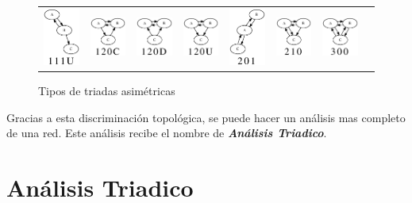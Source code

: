 \begin{figure}[!htb]
\begin{center}
\begin{tabular}{m{1.3cm}|m{1.3cm}|m{1.3cm}|m{1.3cm}|m{1.3cm}|m{1.3cm}|m{1.3cm}|m{1.3cm}}
        \includegraphics[width=1.3cm]{./imagenes/triada_111U.eps} & 
        \includegraphics[width=1.3cm]{./imagenes/triada_120C.eps} & 
        \includegraphics[width=1.3cm]{./imagenes/triada_120D.eps} & 
        \includegraphics[width=1.3cm]{./imagenes/triada_120U.eps} & 
        \includegraphics[width=1.3cm]{./imagenes/triada_201.eps} & 
        \includegraphics[width=1.3cm]{./imagenes/triada_210.eps} & 
        \includegraphics[width=1.3cm]{./imagenes/triada_300.eps}\\
      \end{tabular}
    \caption{Tipos de triadas asimétricas}
    \label{fig:tipos_triadas_asimetricas}
  \end{center}
\end{figure}

Gracias a esta discriminación topológica, se puede hacer un análisis mas completo de una red. Este análisis recibe el nombre de \textbf{\textit{Análisis Triadico}}.

\section{Análisis Triadico}

